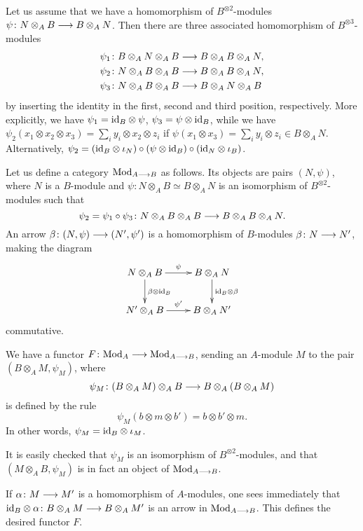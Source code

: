 \begin{4   STACKS}
\begin{4.2 Descent for quasi-coherent sheaves}
Let us assume that we have a homomorphism of $B^{\otimes 2}$-modules $\psi \colon N \otimes_A B \arr B \otimes_A N$. Then there are three associated homomorphism of $B^{\otimes 3}$-modules
   \begin{align*}
   \psi_1 &\colon B \otimes_A N \otimes_A B \arr
   B \otimes_A B \otimes_A N, \\
   \psi_2 &\colon N \otimes_A B \otimes_A B \arr
   B \otimes_A B \otimes_A N, \\
   \psi_3 &\colon N \otimes_A B \otimes_A B \arr
   B \otimes_A N \otimes_{A} B
   \end{align*}
by inserting the identity in the first, second and third position, respectively. More explicitly, we have $\psi_1 = \mathrm{id}_B \otimes \psi$, $\psi_3 = \psi \otimes \mathrm{id}_B$, while we have $\psi_2(x_1 \otimes x_2 \otimes x_3) = \sum_iy_i \otimes x_2 \otimes z_i$ if $\psi(x_1 \otimes x_3) = \sum_iy_i \otimes z_i \in B \otimes_A N$. Alternatively, $\psi_2 = (\mathrm{id}_B \otimes \iota_N) \circ (\psi\otimes\mathrm{id}_{B}) \circ (\mathrm{id}_N \otimes \iota_B)$.

Let us define a category $\catmod{A \arr B}$ as follows. Its objects are pairs $(N, \psi)$, where $N$ is a $B$-module and $\psi \colon N \otimes_A B \simeq B \otimes_A N$ is an isomorphism of $B^{\otimes 2}$-modules such that
   \[
   \psi_2 = \psi_1\circ \psi_3 \colon
   N \otimes_A B \otimes_A B \arr
   B \otimes_A B \otimes_A N.
   \]
An arrow $\beta \colon (N, \psi) \arr (N', \psi')$ is a homomorphism of $B$-modules $\beta \colon N \arr N'$, making the diagram
   \[
   \xymatrix{
   N \otimes_A B \ar[r]^{\psi} \ar[d]^{\beta \otimes \id_B} &
   B \otimes_A N \ar[d]^{\id_B \otimes \beta} \\
   N' \otimes_A B \ar[r]^{\psi'} &
   B \otimes_A N'
   }
   \]
commutative.

We have a functor $F \colon \catmod{A} \arr \catmod{A \arr B}$, sending an $A$-module $M$ to the pair $(B \otimes_A M, \psi_M)$, where
   \[
   \psi_M \colon (B \otimes_A M) \otimes_A B \arr
   B \otimes_A (B \otimes_A M)
   \]
is defined by the rule
   \[
   \psi_M(b \otimes m \otimes b') = b \otimes b' \otimes m.
   \]
In other words, $\psi_M = \mathrm{id}_B \otimes \iota_M$.

It is easily checked that $\psi_M$ is an isomorphism of $B^{\otimes 2}$-modules, and that $(M \otimes_A B, \psi_M)$ is in fact an object of $\catmod{A \arr B}$.

If $\alpha \colon M \arr M'$ is a homomorphism of $A$-modules, one sees immediately that $\id_B \otimes \alpha \colon B \otimes_A M
\arr B \otimes_A M'$ is an arrow in $\catmod{A \arr B}$. This defines the desired functor $F$.



\end{4.2 Descent for quasi-coherent sheaves}
\end{4   STACKS}
